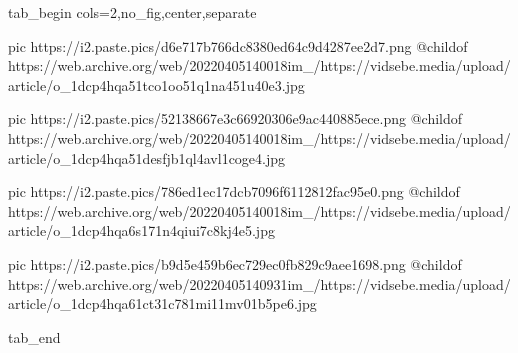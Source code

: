  
 
 
 
 


\ifcmt
  tab_begin cols=2,no_fig,center,separate

     pic https://i2.paste.pics/d6e717b766dc8380ed64c9d4287ee2d7.png
		 @childof https://web.archive.org/web/20220405140018im_/https://vidsebe.media/upload/article/o_1dcp4hqa51tco1oo51q1na451u40e3.jpg

		 pic https://i2.paste.pics/52138667e3c66920306e9ac440885ece.png
		 @childof https://web.archive.org/web/20220405140018im_/https://vidsebe.media/upload/article/o_1dcp4hqa51desfjb1ql4avl1coge4.jpg

		 pic https://i2.paste.pics/786ed1ec17dcb7096f6112812fac95e0.png
		 @childof https://web.archive.org/web/20220405140018im_/https://vidsebe.media/upload/article/o_1dcp4hqa6s171n4qiui7c8kj4e5.jpg

		 pic https://i2.paste.pics/b9d5e459b6ec729ec0fb829c9aee1698.png
		 @childof https://web.archive.org/web/20220405140931im_/https://vidsebe.media/upload/article/o_1dcp4hqa61ct31c781mi11mv01b5pe6.jpg

  tab_end
\fi
